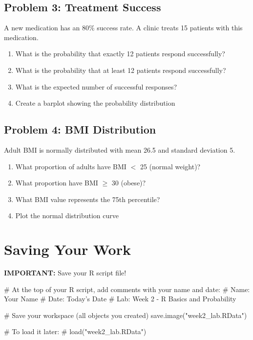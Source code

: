 \documentclass[11pt]{article}
\begin{document}
\subsection{Problem 3: Treatment Success}

A new medication has an 80\% success rate. A clinic treats 15 patients with this medication.

\begin{enumerate}[label=\alph*)]
\item What is the probability that exactly 12 patients respond successfully?
\item What is the probability that at least 12 patients respond successfully?
\item What is the expected number of successful responses?
\item Create a barplot showing the probability distribution
\end{enumerate}

\vspace{3cm}

\subsection{Problem 4: BMI Distribution}

Adult BMI is normally distributed with mean 26.5 and standard deviation 5.

\begin{enumerate}[label=\alph*)]
\item What proportion of adults have BMI $<$ 25 (normal weight)?
\item What proportion have BMI $\geq$ 30 (obese)?
\item What BMI value represents the 75th percentile?
\item Plot the normal distribution curve
\end{enumerate}

\vspace{3cm}

\section{Saving Your Work}

\textbf{IMPORTANT:} Save your R script file!

\begin{rcode}
# At the top of your R script, add comments with your name and date:
# Name: Your Name
# Date: Today's Date
# Lab: Week 2 - R Basics and Probability

# Save your workspace (all objects you created)
save.image("week2_lab.RData")

# To load it later:
# load("week2_lab.RData")
\end{rcode}
\end{document}
